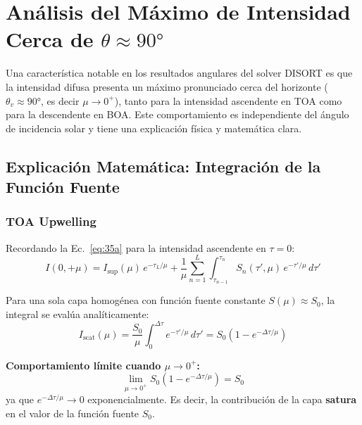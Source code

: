\documentclass[a4paper,11pt]{article}
\begin{document}
\section{An\'alisis del M\'aximo de Intensidad Cerca de $\theta \approx 90°$}
\label{sec:horizon_max}

Una caracter\'istica notable en los resultados angulares del solver DISORT es que la intensidad difusa presenta un m\'aximo pronunciado cerca del horizonte ($\theta_v \approx 90°$, es decir $\mu \to 0^+$), tanto para la intensidad ascendente en TOA como para la descendente en BOA.  Este comportamiento es independiente del \'angulo de incidencia solar y tiene una explicaci\'on f\'isica y matem\'atica clara.

\subsection{Explicaci\'on Matem\'atica: Integraci\'on de la Funci\'on Fuente}

\subsubsection{TOA Upwelling}

Recordando la Ec.~\eqref{eq:35a} para la intensidad ascendente en $\tau = 0$:
\begin{equation}
I(0, +\mu) = I_{\text{sup}}(\mu) \, e^{-\tau_L/\mu} + \frac{1}{\mu} \sum_{n=1}^{L} \int_{\tau_{n-1}}^{\tau_n} S_n(\tau', \mu) \, e^{-\tau'/\mu} \, d\tau'
\end{equation}

Para una sola capa homog\'enea con funci\'on fuente constante $S(\mu) \approx S_0$, la integral se evalúa anal\'iticamente:
\begin{equation}
I_{\text{scat}}(\mu) = \frac{S_0}{\mu} \int_0^{\Delta\tau} e^{-\tau'/\mu} \, d\tau' = S_0 \left(1 - e^{-\Delta\tau/\mu}\right)
\label{eq:limb_integral}
\end{equation}

\textbf{Comportamiento l\'imite cuando $\mu \to 0^+$:}
\begin{equation}
\lim_{\mu \to 0^+} S_0 \left(1 - e^{-\Delta\tau/\mu}\right) = S_0
\end{equation}
ya que $e^{-\Delta\tau/\mu} \to 0$ exponencialmente.  Es decir, la contribuci\'on de la capa \textbf{satura} en el valor de la funci\'on fuente $S_0$.
\end{document}

